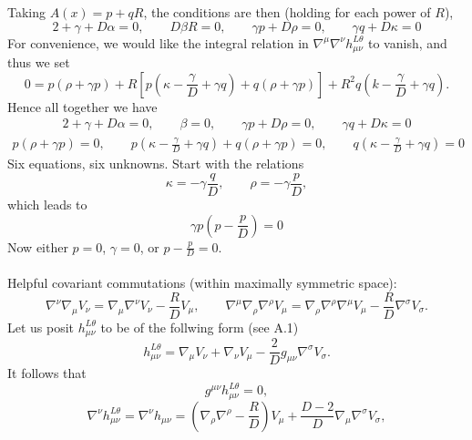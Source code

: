 \documentclass[10pt,letterpaper]{article}
\begin{document}
Taking $A(x) = p+qR$, the conditions are then (holding for each power of $R$), 
\begin{equation}
2+\gamma + D\alpha = 0,\qquad D\beta R = 0,\qquad \gamma p + D\rho = 0,\qquad \gamma q + D\kappa = 0
\end{equation}
For convenience, we would like the integral relation in $\nabla^\mu \nabla^\nu h_{\mu\nu}^{L\theta}$ to vanish, and thus we set
\begin{equation}
0= p(\rho +\gamma p) + R\left[ p(\kappa-\frac{\gamma}{D} + \gamma q)+q(\rho+\gamma p)\right] + R^2 q\left( k - \frac{\gamma}{D} + \gamma q\right).
\end{equation}
Hence all together we have
\begin{align}
2+\gamma + D\alpha = 0,\qquad \beta =0,\qquad \gamma p + D\rho = 0,\qquad \gamma q + D\kappa = 0
\end{align}
\begin{align}
p(\rho +\gamma p) = 0,\qquad  p(\kappa-\frac{\gamma}{D} + \gamma q)+q(\rho+\gamma p)=0,\qquad 
q\left( \kappa - \frac{\gamma}{D} + \gamma q\right)=0
\end{align}
Six equations, six unknowns. Start with the relations
\begin{equation}
\kappa = -\gamma \frac{q}{D},\qquad \rho = -\gamma \frac{p}{D},
\end{equation}
which leads to 
\begin{equation}
\gamma p \left( p - \frac{p}{D}\right) = 0
\end{equation}
Now either $p=0$, $\gamma=0$, or $p -\frac pD = 0$. 
\\ \\
Helpful covariant commutations (within maximally symmetric space):
\begin{equation}
\nabla^\nu \nabla_\mu V_\nu = \nabla_\mu \nabla^\nu V_\nu - \frac{R}{D}V_\mu,\qquad
\nabla^\mu \nabla_\rho \nabla^\rho V_\mu = \nabla_\rho \nabla^\rho \nabla^\mu V_\mu - \frac{R}{D}\nabla^\sigma V_\sigma.
\end{equation}
Let us posit $h_{\mu\nu}^{L\theta}$ to be of the follwing form (see A.1)
\begin{equation}
h_{\mu\nu}^{L\theta} = \nabla_\mu V_\nu +\nabla_\nu V_\mu -\frac{2}{D} g_{\mu\nu} \nabla^\sigma V_\sigma.
\end{equation}
It follows that 
\begin{equation}
 g^{\mu\nu} h_{\mu\nu}^{L\theta} = 0,
\end{equation}
\begin{equation}
\nabla^\nu h_{\mu\nu}^{L\theta} = \nabla^\nu h_{\mu\nu}= \left( \nabla_\rho \nabla^\rho - \frac{R}{D}\right) V_\mu + \frac{D-2}{D} \nabla_\mu \nabla^\sigma V_\sigma,
\end{equation}
\end{document}
